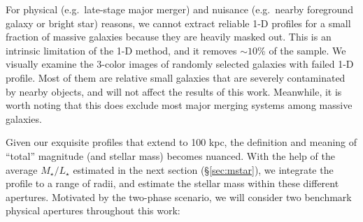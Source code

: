 \documentclass[a4paper,fleqn,usenatbib]{mnras}
\def\rbcg{\texttt{cenHighMh}}
\def\nbcg{\texttt{cenLowMh}}
\def\m2l{{$M_{\star}/L_{\star}$}}
\begin{document}
    
    For physical (e.g.\ late-stage major merger) and nuisance (e.g.\ nearby foreground 
    galaxy or bright star) reasons, we cannot extract reliable 1-D profiles for a small 
    fraction of massive galaxies because they are heavily masked out. 
    This is an intrinsic limitation of the 1-D method, and it removes ${\sim}10$\% of 
    the sample.
    We visually examine the 3-color images of randomly selected galaxies with failed 
    1-D profile.  
    Most of them are relative small galaxies that are severely contaminated by nearby 
    objects, and will not affect the results of this work.  
    Meanwhile, it is worth noting that this does exclude most major merging systems 
    among massive galaxies. 
        
    Given our exquisite profiles that extend to 100 kpc, the definition and meaning 
    of ``total'' magnitude (and stellar mass) becomes nuanced.
    With the help of the average \m2l{} estimated in the next section 
    (\S \ref{sec:mstar}), we integrate the profile to a range of radii, and estimate 
    the stellar mass within these different apertures.  
    Motivated by the two-phase scenario, we will consider two benchmark physical 
    apertures throughout this work:
    
\end{document}
